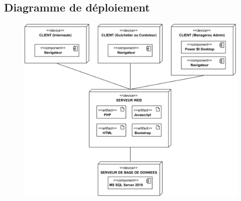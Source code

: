     \subsection[Diagramme de déploiement]{Diagramme de déploiement}
        \begin{figure}[H]
            \centering
            \includegraphics[width=150mm]{images/diagramme-de-deploiement/Diagramme de deploiement Deployment Diagram.png}
            \label{fig:diagDeploi}
        \end{figure}
